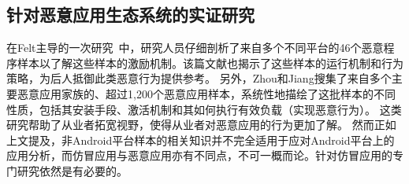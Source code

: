 \subsection{针对恶意应用生态系统的实证研究}

在Felt主导的一次研究~\cite{Felt2011ASO}中，研究人员仔细剖析了来自多个不同平台的46个恶意程序样本以了解这些样本的激励机制。该篇文献也揭示了这些样本的运行机制和行为策略，为后人抵御此类恶意行为提供参考。
另外，Zhou和Jiang搜集了来自多个主要恶意应用家族的、超过1,200个恶意应用样本，系统性地描绘了这批样本的不同性质，包括其安装手段、激活机制和其如何执行有效负载（实现恶意行为）。
这类研究帮助了从业者拓宽视野，使得从业者对恶意应用的行为更加了解。
然而正如上文提及，非Android平台样本的相关知识并不完全适用于应对Android平台上的应用分析，而仿冒应用与恶意应用亦有不同点，不可一概而论。针对仿冒应用的专门研究依然是有必要的。



